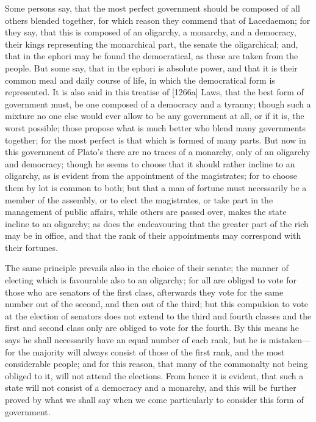 Some persons say, that the most perfect government should be composed of
all others blended together, for which reason they commend that of
Lacedaemon; for they say, that this is composed of an oligarchy, a
monarchy, and a democracy, their kings representing the monarchical part,
the senate the oligarchical; and, that in the ephori may be found the
democratical, as these are taken from the people. But some say, that in
the ephori is absolute power, and that it is their common meal and daily
course of life, in which the democratical form is represented. It is also
said in this treatise of [1266a] Laws, that the best form of government
must, be one composed of a democracy and a tyranny; though such a mixture
no one else would ever allow to be any government at all, or if it is, the
worst possible; those propose what is much better who blend many
governments together; for the most perfect is that which is formed of many
parts. But now in this government of Plato's there are no traces of a
monarchy, only of an oligarchy and democracy; though he seems to choose
that it should rather incline to an oligarchy, as is evident from the
appointment of the magistrates; for to choose them by lot is common to
both; but that a man of fortune must necessarily be a member of the
assembly, or to elect the magistrates, or take part in the management of
public affairs, while others are passed over, makes the state incline to
an oligarchy; as does the endeavouring that the greater part of the rich
may be in office, and that the rank of their appointments may correspond
with their fortunes.

The same principle prevails also in the choice of their senate; the manner
of electing which is favourable also to an oligarchy; for all are obliged
to vote for those who are senators of the first class, afterwards they
vote for the same number out of the second, and then out of the third; but
this compulsion to vote at the election of senators does not extend to the
third and fourth classes and the first and second class only are obliged
to vote for the fourth. By this means he says he shall necessarily have an
equal number of each rank, but he is mistaken—for the majority will
always consist of those of the first rank, and the most considerable
people; and for this reason, that many of the commonalty not being obliged
to it, will not attend the elections. From hence it is evident, that such
a state will not consist of a democracy and a monarchy, and this will be
further proved by what we shall say when we come particularly to consider
this form of government.

